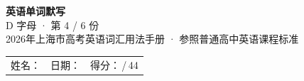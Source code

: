 \documentclass[10pt,a4paper]{article}
\begin{document}
\pagestyle{plain}

\begin{center}
{\LARGE\bfseries 英语单词默写}\\[0.22em]
{\large D 字母 · 第 4 / 6 份}\\[0.18em]
{\small 2026年上海市高考英语词汇用法手册 · 参照普通高中英语课程标准}
\end{center}

\vspace{0.25em}
\noindent\begin{tabular}{@{}p{}@{}p{}@{}p{}@{}}
姓名：\underline{\hspace{2.0cm}} & 日期：\underline{\hspace{2.0cm}} & 得分：\underline{\hspace{1.3cm}}\,/\,44 \\
\end{tabular}

\vspace{0.3em}

\vspace{0.08em}
\end{document}
